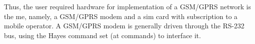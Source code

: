 Thus, the user required hardware for implementation of a GSM/GPRS network is the
\gls{me}, namely, a GSM/GPRS modem and a \gls{sim} card with subscription to a
mobile operator. A GSM/GPRS modem is generally driven through the RS-232 bus,
using the Hayes command set (\gls{at} commands) to interface it.
